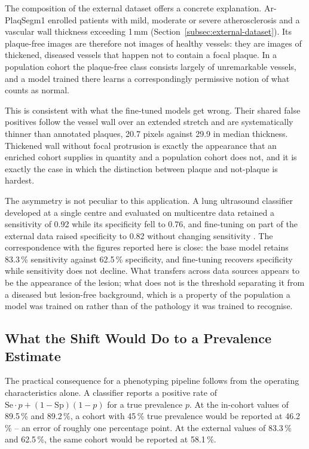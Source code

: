 The composition of the external dataset offers a concrete explanation. Ar-PlaqSegm1 enrolled
patients with mild, moderate or severe atherosclerosis and a vascular wall thickness exceeding
1\,mm (Section~\ref{subsec:external-dataset}). Its plaque-free images are therefore not images of
healthy vessels: they are images of thickened, diseased vessels that happen not to contain a
focal plaque. In a population cohort the plaque-free class consists largely of unremarkable
vessels, and a model trained there learns a correspondingly permissive notion of what counts as
normal.

This is consistent with what the fine-tuned models get wrong. Their shared false positives follow
the vessel wall over an extended stretch and are systematically thinner than annotated plaques,
20.7 pixels against 29.9 in median thickness. Thickened wall without focal protrusion is exactly
the appearance that an enriched cohort supplies in quantity and a population cohort does not, and
it is exactly the case in which the distinction between plaque and not-plaque is hardest.

The asymmetry is not peculiar to this application. A lung ultrasound classifier developed at a
single centre and evaluated on multicentre data retained a sensitivity of 0.92 while its
specificity fell to 0.76, and fine-tuning on part of the external data raised specificity to 0.82
without changing sensitivity \cite{wu2024generalizability}. The correspondence with the figures
reported here is close: the base model retains 83.3\,\% sensitivity against 62.5\,\%
specificity, and fine-tuning recovers specificity while sensitivity does not decline. What
transfers across data sources appears to be the appearance of the lesion; what does not is the
threshold separating it from a diseased but lesion-free background, which is a property of the
population a model was trained on rather than of the pathology it was trained to recognise.

\subsection{What the Shift Would Do to a Prevalence Estimate}

The practical consequence for a phenotyping pipeline follows from the operating characteristics
alone. A classifier reports a positive rate of $\text{Se} \cdot p + (1 - \text{Sp})(1 - p)$ for a
true prevalence $p$. At the in-cohort values of 89.5\,\% and 89.2\,\%, a cohort with 45\,\% true
prevalence would be reported at 46.2\,\% -- an error of roughly one percentage point. At the
external values of 83.3\,\% and 62.5\,\%, the same cohort would be reported at 58.1\,\%.

